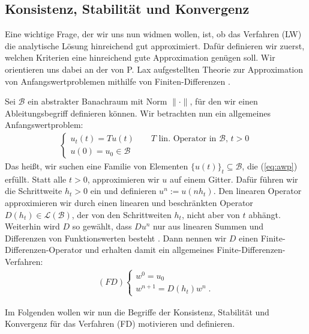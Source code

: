 \subsection{Konsistenz, Stabilität und Konvergenz}

Eine wichtige Frage, der wir uns nun widmen wollen, ist, ob das Verfahren (LW) die analytische Lösung hinreichend gut approximiert. Dafür definieren wir zuerst, welchen Kriterien eine hinreichend gute Approximation genügen soll. Wir orientieren uns dabei an der von P. Lax aufgestellten Theorie zur Approximation von Anfangswertproblemen mithilfe von Finiten-Differenzen \parencite[][Kapitel 3]{richtmyer1994difference}.

Sei $\mathcal{B}$ ein abstrakter Banachraum mit Norm $\|\cdot\|$, für den wir einen Ableitungsbegriff definieren können. Wir betrachten nun ein allgemeines Anfangswertproblem:
\begin{align}
    \begin{cases}
        u_t(t) = T u(t) \qquad T \text{ lin. Operator in } \mathcal{B}, \, t>0\\
        u(0) = u_0 \in \mathcal{B}
    \end{cases}\label{eq:awp}
\end{align}
Das heißt, wir suchen eine Familie von Elementen $\{u(t)\}_t \subseteq \mathcal{B}$, die  (\ref{eq:awp}) erfüllt. Statt alle $t>0$, approximieren wir $u$ auf einem Gitter. Dafür führen wir die Schrittweite $h_t>0$ ein und definieren $u^n:=u(nh_t)$. Den linearen Operator approximieren wir durch einen linearen und beschränkten Operator $D(h_t) \in \mathcal{L}(\mathcal{B})$, der von den Schrittweiten $h_t$, nicht aber von $t$ abhängt. Weiterhin wird $D$ so gewählt, dass $Du^n$ nur aus linearen Summen und Differenzen von Funktionswerten besteht \parencite[vgl.][S. 43]{richtmyer1994difference}. Dann nennen wir $D$ einen Finite-Differenzen-Operator und erhalten damit ein allgemeines Finite-Differenzen-Verfahren:
\begin{align*} 
    (FD)
    \begin{cases}
        w^0 = u_0 \\
        w^{n+1} = D(h_t) w^n \; .
    \end{cases}
\end{align*}
 
Im Folgenden wollen wir nun die Begriffe der Konsistenz, Stabilität und Konvergenz für das Verfahren (FD) motivieren und definieren.  \\\\

